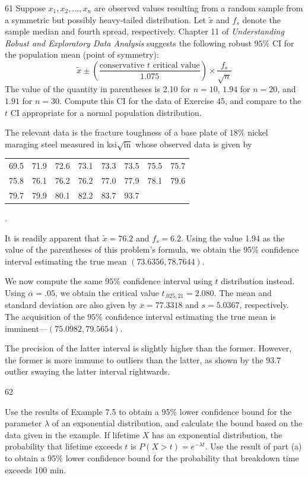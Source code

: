 \documentclass{exam}
\newcommand{\paren}[1]{\left(#1\right)}
\begin{document}
\begin{problem}{61}
	Suppose $x_1, x_2, \dots, x_n$ are observed values resulting from a random sample from a symmetric but possibly heavy-tailed distribution. Let $\widetilde{x}$ and $f_s$ denote the sample median and fourth spread, respectively. Chapter 11 of \textit{Understanding Robust and Exploratory Data Analysis} suggests the following robust $95\%$ CI for the population mean (point of symmetry):
	\[
		\widetilde{x} \pm \paren{\frac{\text{conservative $t$ critical value}}{1.075}} \times \frac{f_s}{\sqrt{n}}
	\]
	The value of the quantity in parentheses is 2.10 for $n = 10$, $1.94$ for $n = 20$, and $1.91$ for $n = 30$. Compute this CI for the data of Exercise 45, and compare to the $t$ CI appropriate for a normal population distribution.
\end{problem}

The relevant data is the fracture toughness of a base plate of $18\%$ nickel maraging steel measured in ksi$\sqrt{\text{in}}$ whose observed data is given by
\begin{center}
	\bgroup
	\def\arraystretch{1.5}
	\begin{tabular}{cccccccc}
		69.5 & 71.9 & 72.6 & 73.1 & 73.3 & 73.5 & 75.5 & 75.7 \\
		75.8 & 76.1 & 76.2 & 76.2 & 77.0 & 77.9 & 78.1 & 79.6 \\
		79.7 & 79.9 & 80.1 & 82.2 & 83.7 & 93.7
	\end{tabular}.
	\egroup
\end{center}
It is readily apparent that $\widetilde{x} = 76.2$ and $f_s = 6.2$. Using the value 1.94 as the value of the parentheses of this problem's formula, we obtain the 95\% confidence interval estimating the true mean $(73.6356, 78.7644)$.

We now compute the same $95\%$ confidence interval using $t$ distribution instead. Using $\alpha = .05$, we obtain the critical value $t_{.025, 21} = 2.080$. The mean and standard deviation are also given by $\overline{x} = 77.3318$ and $s = 5.0367$, respectively. The acquisition of the $95\%$ confidence interval estimating the true mean is imminent---$(75.0982, 79.5654)$.

The precision of the latter interval is slightly higher than the former. However, the former is more immune to outliers than the latter, as shown by the 93.7 outlier swaying the latter interval rightwards.

\begin{problem}{62}
	\begin{tasks}[label=\textbf{\alph*.}]
		\task Use the results of Example 7.5 to obtain a 95\% lower confidence bound for the parameter $\lambda$ of an exponential distribution, and calculate the bound based on the data given in the example.
		\task If lifetime $X$ has an exponential distribution, the probability that lifetime exceeds $t$ is $P(X > t) = e^{-\lambda t}$. Use the result of part (a) to obtain a 95\% lower confidence bound for the probability that breakdown time exceeds 100 min.
	\end{tasks}
\end{problem}
\end{document}
